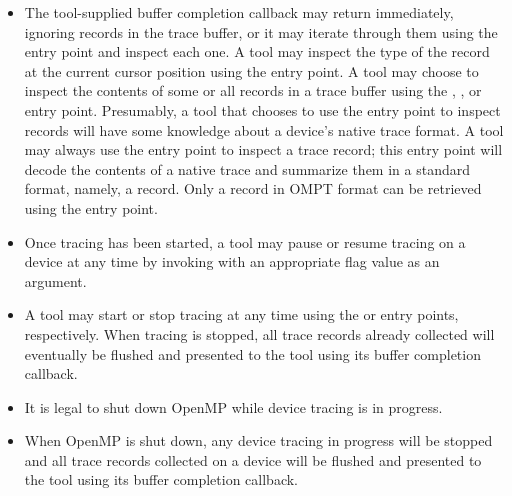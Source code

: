 \begin{itemize}
\item The tool-supplied buffer completion callback may return
  immediately, ignoring records in the trace buffer, or it may iterate
  through them using the  entry
  point
  and inspect each one. A tool may inspect the type of the record at
  the current cursor position using the 
  entry point.  A tool may choose to inspect the contents of some or
  all records in a trace buffer using the ,
  , or
   entry point.  Presumably, a tool that
  chooses to use the  entry point to
  inspect records will have some knowledge about a device's native
  trace format.  A tool may always use the
   entry point to inspect a trace
  record; this entry point will decode the contents of a native trace
  and summarize them in a standard format, namely, a
   record.
  Only a record in OMPT format can be retrieved using the
   entry point.
\item Once tracing has been started, a tool may pause or resume
  tracing on a device at any time by invoking
   with an appropriate flag value as an
  argument.  
\item A tool may start or stop tracing at any time using the 
   or  entry points,
  respectively. When tracing is stopped, all trace records already
  collected will eventually be flushed and presented to the tool using
  its buffer completion callback.
\item It is legal to shut down OpenMP while device tracing 
is in progress.  
\item When OpenMP is shut down, any device tracing in progress will be
  stopped and all trace records collected on a device will be flushed
  and presented to the tool using its buffer completion callback.
\end{itemize}


